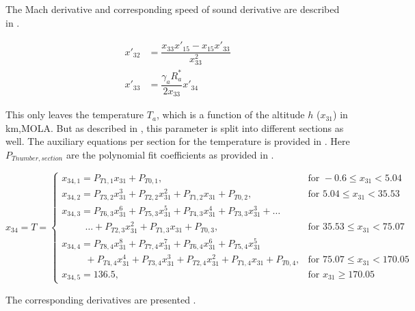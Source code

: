 The Mach derivative and corresponding speed of sound derivative are described in .

 \begin{equation} \label{eq:cdDerAux}
\begin{split}
x'_{32} &= \dfrac{x_{33}x'_{15}-x_{15}x'_{33}}{x_{33}^{2}}\\
x'_{33} &= \dfrac{\gamma_{a}R_{a}^{*}}{2x_{33}}x'_{34} 
\end{split}
\end{equation}

This only leaves the temperature $T_{a}$, which is a function of the altitude $h$ ($x_{31}$) in km,\ac{MOLA}. But as described in , this parameter is split into different sections as well. The auxiliary equations per section for the temperature is provided in . Here $P_{T number,section}$ are the polynomial fit coefficients as provided in .

\begin{equation}\label{eq:tempCondAux}
x_{34}=T=\begin{cases}
x_{34,1}=P_{T 1,1}x_{31}+P_{T 0,1}, & \text{for } -0.6 \leq x_{31} < 5.04  \\
x_{34,2}=P_{T 3,2}x_{31}^{3}+P_{T 2,2}x_{31}^{2}+P_{T 1,2}x_{31}+P_{T 0,2}, &  \text{for } 5.04 \leq x_{31} < 35.53   \\
x_{34,3}=P_{T 6,3}x_{31}^{6}+P_{T 5,3}x_{31}^{5}+P_{T 4,3}x_{31}^{4}+P_{T 3,3}x_{31}^{3}+ \dots \\
\qquad\ \ \dotsc +P_{T 2,3}x_{31}^{2}+P_{T 1,3}x_{31}+P_{T 0,3}, &  \text{for } 35.53 \leq x_{31} < 75.07   \\
x_{34,4}=P_{T 8,4}x_{31}^{8}+P_{T 7,4}x_{31}^{7}+P_{T 6,4}x_{31}^{6}+P_{T 5,4}x_{31}^{5} \\
\qquad\ \ +P_{T 4,4}x_{31}^{4}+P_{T 3,4}x_{31}^{3}+P_{T 2,4}x_{31}^{2}+P_{T 1,4}x_{31}+P_{T 0,4}, &  \text{for } 75.07 \leq x_{31} < 170.05   \\
x_{34,5}=136.5, &  \text{for }  x_{31} \geq 170.05   
\end{cases}
\end{equation}

The corresponding derivatives are presented .

